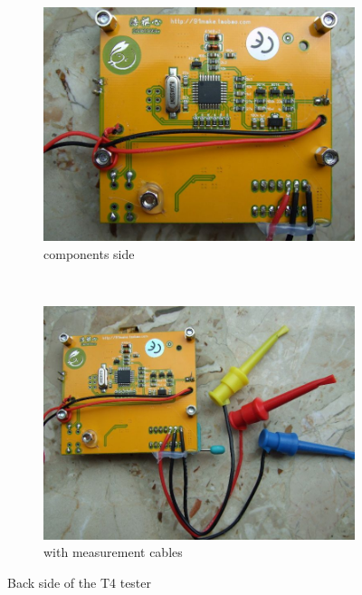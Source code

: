 \begin{figure}[H]
  \begin{subfigure}[b]{.5\textwidth}
    \centering
    \includegraphics[width=1.\textwidth]{../PNG/T4_back.JPG}
    \caption{components side}
  \end{subfigure}
  ~
  \begin{subfigure}[b]{.5\textwidth}
    \centering
    \includegraphics[width=1.\textwidth]{../PNG/T4_back_clips.JPG}
    \caption{with measurement cables}
  \end{subfigure}
  \caption{Back side of the T4 tester}
  \label{fig:T4_back}
\end{figure}

